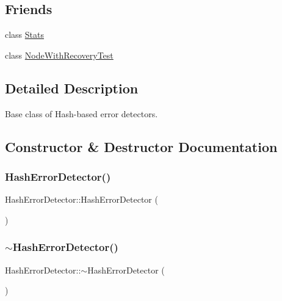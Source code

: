 \subsection*{Friends}
\begin{DoxyCompactItemize}
\item 
class \hyperlink{class_hash_error_detector_a129f65b6976377739eb6231b6962985e}{Stats}
\item 
class \hyperlink{class_hash_error_detector_a4a759c82473f06c7e89c3d75a509a390}{Node\+With\+Recovery\+Test}
\end{DoxyCompactItemize}


\subsection{Detailed Description}
Base class of Hash-\/based error detectors. 



\subsection{Constructor \& Destructor Documentation}
\mbox{\label{class_hash_error_detector_a008bd7bd3f8d202334afd51a71cbbdae}} 
\subsubsection{\texorpdfstring{Hash\+Error\+Detector()}{HashErrorDetector()}}
{\footnotesize\ttfamily Hash\+Error\+Detector\+::\+Hash\+Error\+Detector (\begin{DoxyParamCaption}{ }\end{DoxyParamCaption})}

\mbox{\label{class_hash_error_detector_a187ba4d9f902ecaa0ff8b92ec531d3f4}} 
\subsubsection{\texorpdfstring{$\sim$\+Hash\+Error\+Detector()}{~HashErrorDetector()}}
{\footnotesize\ttfamily Hash\+Error\+Detector\+::$\sim$\+Hash\+Error\+Detector (\begin{DoxyParamCaption}{ }\end{DoxyParamCaption})\hspace{0.3cm}{\ttfamily [virtual]}}



